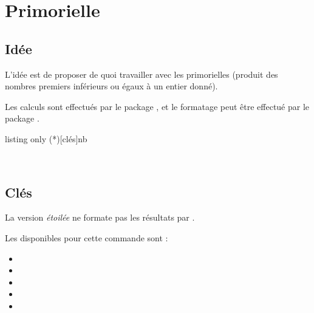 \begin{PresCodePL}{}
\end{PresCodePL}

\newpage

\section{Primorielle}\label{primoriel}

\subsection{Idée}

\begin{tipblock}
 L'idée est de proposer de quoi travailler avec les primorielles (produit des nombres premiers inférieurs ou égaux à un entier donné).

Les calculs sont effectués par le package , et le formatage peut être effectué par le package .
\end{tipblock}

\begin{PresCodeTexPL}{listing only}
\Primorielle(*)[clés]{nb}
\end{PresCodeTexPL}

\begin{PresCodePL}{}
\\
\end{PresCodePL}

\subsection{Clés}

\begin{cautionblock}
La version \textit{étoilée} ne formate pas les résultats par .

\smallskip

Les  disponibles pour cette commande sont :

\begin{itemize}
	\item {}
	\item {}
	\item {}
	\item {}
	\item {}
\end{itemize}
\vspace*{-\baselineskip}\leavevmode
\end{cautionblock}

